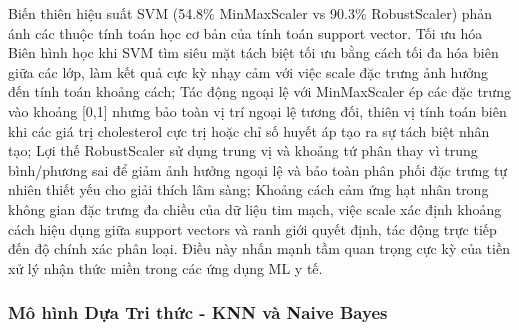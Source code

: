 Biến thiên hiệu suất SVM (54.8\% MinMaxScaler vs 90.3\% RobustScaler) phản ánh các thuộc tính toán học cơ bản của tính toán support vector. Tối ưu hóa Biên hình học khi SVM tìm siêu mặt tách biệt tối ưu bằng cách tối đa hóa biên giữa các lớp, làm kết quả cực kỳ nhạy cảm với việc scale đặc trưng ảnh hưởng đến tính toán khoảng cách; Tác động ngoại lệ với MinMaxScaler ép các đặc trưng vào khoảng [0,1] nhưng bảo toàn vị trí ngoại lệ tương đối, thiên vị tính toán biên khi các giá trị cholesterol cực trị hoặc chỉ số huyết áp tạo ra sự tách biệt nhân tạo; Lợi thế RobustScaler sử dụng trung vị và khoảng tứ phân thay vì trung bình/phương sai để giảm ảnh hưởng ngoại lệ và bảo toàn phân phối đặc trưng tự nhiên thiết yếu cho giải thích lâm sàng; Khoảng cách cảm ứng hạt nhân trong không gian đặc trưng đa chiều của dữ liệu tim mạch, việc scale xác định khoảng cách hiệu dụng giữa support vectors và ranh giới quyết định, tác động trực tiếp đến độ chính xác phân loại. Điều này nhấn mạnh tầm quan trọng cực kỳ của tiền xử lý nhận thức miền trong các ứng dụng ML y tế.

\subsubsection{Mô hình Dựa Tri thức - KNN và Naive Bayes}

